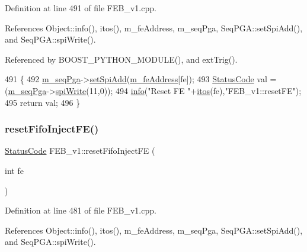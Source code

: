Definition at line 491 of file F\+E\+B\+\_\+v1.\+cpp.



References Object\+::info(), itos(), m\+\_\+fe\+Address, m\+\_\+seq\+Pga, Seq\+P\+G\+A\+::set\+Spi\+Add(), and Seq\+P\+G\+A\+::spi\+Write().



Referenced by B\+O\+O\+S\+T\+\_\+\+P\+Y\+T\+H\+O\+N\+\_\+\+M\+O\+D\+U\+L\+E(), and ext\+Trig().


\begin{DoxyCode}
491                                 \{  
492   \hyperlink{classFEB__v1_a6c7804ac86796f233a8393043adf2e77}{m\_seqPga}->\hyperlink{classSeqPGA_ac998ce3a6d9b5f2e88cc8393f8c1df53}{setSpiAdd}(\hyperlink{classFEB__v1_a4e1945c2d5b434125f375e9d0fc6d99f}{m\_feAddress}[fe]);
493   \hyperlink{classStatusCode}{StatusCode} val = (\hyperlink{classFEB__v1_a6c7804ac86796f233a8393043adf2e77}{m\_seqPga}->\hyperlink{classSeqPGA_ad4421841ce4ce8b88ad13f63216f0743}{spiWrite}(11,0));
494   \hyperlink{classObject_a644fd329ea4cb85f54fa6846484b84a8}{info}(\textcolor{stringliteral}{"Reset FE "}+\hyperlink{Tools_8h_af330027dbdafb9a30768b3613c553e60}{itos}(fe),\textcolor{stringliteral}{"FEB\_v1::resetFE"});
495   \textcolor{keywordflow}{return} val;
496 \}
\end{DoxyCode}
\mbox{\label{classFEB__v1_a71d10a772bda2506fd7adb86739fb24d}} 
\subsubsection{\texorpdfstring{reset\+Fifo\+Inject\+F\+E()}{resetFifoInjectFE()}}
{\footnotesize\ttfamily \hyperlink{classStatusCode}{Status\+Code} F\+E\+B\+\_\+v1\+::reset\+Fifo\+Inject\+FE (\begin{DoxyParamCaption}\item[{int}]{fe }\end{DoxyParamCaption})}



Definition at line 481 of file F\+E\+B\+\_\+v1.\+cpp.



References Object\+::info(), itos(), m\+\_\+fe\+Address, m\+\_\+seq\+Pga, Seq\+P\+G\+A\+::set\+Spi\+Add(), and Seq\+P\+G\+A\+::spi\+Write().



